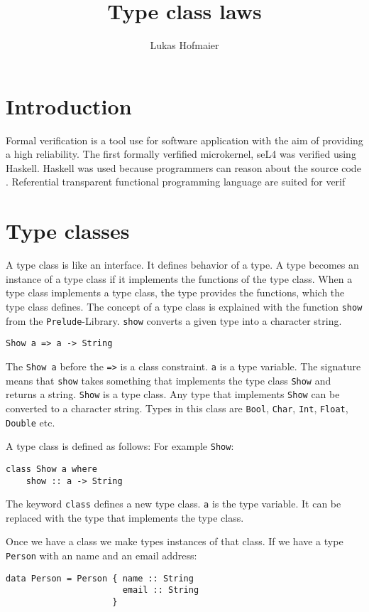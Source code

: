 \documentclass[twoside, a4paper]{article}
\author{Lukas Hofmaier}
\title{Type class laws}
\begin{document}
\maketitle
\tableofcontents

\section{Introduction}
\label{sec:intro}

Formal verification is a tool use for software application with the aim of providing a high reliability. The first formally verfified microkernel, seL4 was verified using Haskell. Haskell was used because programmers can reason about the source code \cite{Klein09}.
Referential transparent functional programming language are suited for verif

\section{Type classes}
\label{sec:typeclasses}

A type class is like an interface. It defines behavior of a type. A type becomes an instance of a type class if it implements the functions of the type class. When a type class implements a type class, the type provides the functions, which the type class defines.
The concept of a type class is explained with the function \verb|show| from the \verb|Prelude|-Library. \verb|show| converts a given type into a character string.
\begin{verbatim}
Show a => a -> String
\end{verbatim}
The \verb|Show a| before the \verb|=>| is a class constraint. \verb|a| is a type variable. The signature means that \verb|show| takes something that implements the type class \verb|Show| and returns a string. \verb|Show| is a type class. Any type that implements \verb|Show| can be converted to a character string. Types in this class are \verb|Bool|, \verb|Char|, \verb|Int|, \verb|Float|, \verb|Double| etc.

A type class is defined as follows: For example \verb|Show|:
\begin{verbatim}
class Show a where
    show :: a -> String
\end{verbatim}
The keyword \verb|class| defines a new type class. \verb|a| is the type variable. It can be replaced with the type that implements the type class.

Once we have a class we make types instances of that class. If we have a type \verb|Person| with an name and an email address:
\begin{verbatim}
data Person = Person { name :: String
                       email :: String
                     }
\end{verbatim}
\end{document}
